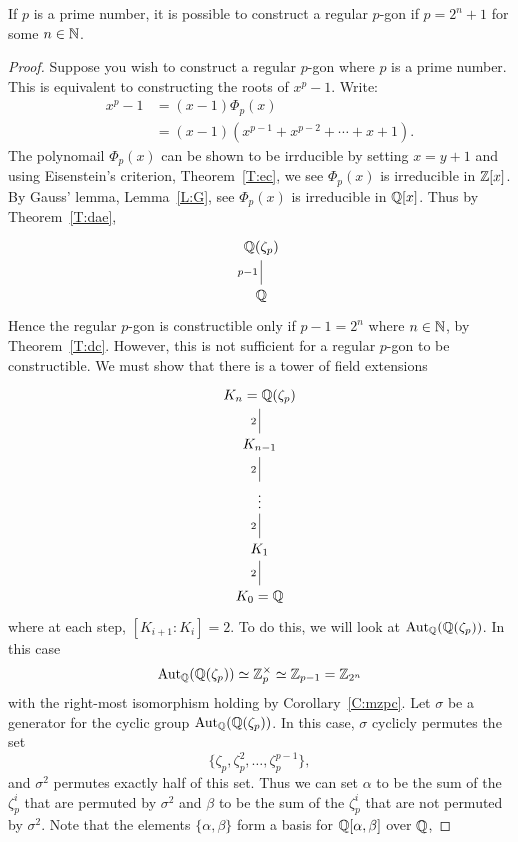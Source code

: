 \documentclass{ximera}
\begin{document}
\begin{theorem}
  If $p$ is a prime number, it is possible to construct a regular
  $p$-gon if $p= 2^n+1$ for some $n\in \mathbb N$.
  \begin{proof}
    Suppose you wish to construct a regular $p$-gon where $p$ is a
    prime number. This is equivalent to constructing the roots of
    $x^p-1$. Write:
    \begin{align*}
      x^{p} -1 &= (x-1) \Phi_{p}(x)\\
      &= (x-1)(x^{p-1} + x^{p-2} + \cdots + x+1).
    \end{align*}
    The polynomail $\Phi_{p}(x)$ can be shown to be irrducible by
    setting $x = y+1$ and using Eisenstein's criterion,
    Theorem~\ref{T:ec}, we see $\Phi_{p}(x)$ is irreducible in
    $\mathbb Z[x]$. By Gauss' lemma, Lemma~\ref{L:G}, see $\Phi_{p}(x)$ is
    irreducible in $\mathbb Q[x]$. Thus by Theorem~\ref{T:dae}, 
    \[
    \begin{tikzcd}
      \Q(\zeta_{p})\\
      \Q\ar[u, -, "p-1"]
    \end{tikzcd}
    \]
    Hence the regular $p$-gon is constructible only if $p-1 = 2^n$
    where $n\in \mathbb N$, by Theorem~\ref{T:dc}. However, this is not
    sufficient for a regular $p$-gon to be constructible. We must show
    that there is a tower of field extensions 
    \[
    \begin{tikzcd}
      K_n=\Q(\zeta_{p})\\
      K_{n-1}\ar[u, -, "2"]\\
      \vdots\ar[u, -, "2"]\\
      K_1\ar[u, -, "2"]\\
      K_0=\Q\ar[u, -, "2"]
    \end{tikzcd}
    \]
    where at each step, $[K_{i+1}:K_i]=2$. To do this, we will look at
    $\operatorname{Aut}_\mathbb Q(\mathbb Q(\zeta_p))$. In this case
    \[
    \operatorname{Aut}_\mathbb Q(\mathbb Q(\zeta_p))\simeq\mathbb Z_p^\times \simeq \mathbb Z_{p-1} = \mathbb Z_{2^n}
    \]
    with the right-most isomorphism holding by
    Corollary~\ref{C:mzpc}. Let $\sigma$ be a generator for the cyclic
    group $\operatorname{Aut}_\mathbb Q(\mathbb Q(\zeta_p))$. In this case, $\sigma$ cyclicly permutes the set
    \[
    \{\zeta_p,\zeta_p^2,\dots,\zeta_p^{p-1}\},
    \]
    and $\sigma^2$ permutes exactly half of this set. Thus we can set
    $\alpha$ to be the sum of the $\zeta_p^i$ that are permuted by
    $\sigma^2$ and $\beta$ to be the sum of the $\zeta_p^i$ that are
    not permuted by $\sigma^2$.  Note that the elements
    $\{\alpha,\beta\}$ form a basis for $\mathbb Q[\alpha,\beta]$ over $\mathbb Q$,

\end{proof}
\end{theorem}
\end{document}
